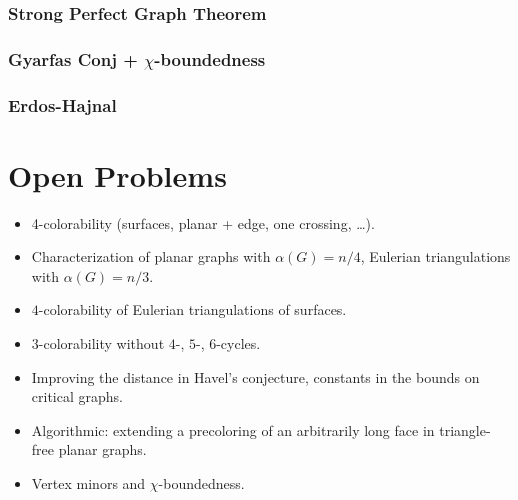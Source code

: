 \documentclass[12pt,twoside,openright,a4paper]{book}
\begin{document}
\section{Strong Perfect Graph Theorem}
\section{Gyarfas Conj + $\chi$-boundedness}
\section{Erdos-Hajnal}

\part{Open Problems}

\begin{itemize}
\item 4-colorability (surfaces, planar + edge, one crossing, \ldots).
\item Characterization of planar graphs with $\alpha(G)=n/4$, Eulerian triangulations with $\alpha(G)=n/3$.
\item $4$-colorability of Eulerian triangulations of surfaces.
\item $3$-colorability without $4$-, $5$-, $6$-cycles.
\item Improving the distance in Havel's conjecture, constants in the bounds on critical graphs.
\item Algorithmic: extending a precoloring of an arbitrarily long face in triangle-free planar graphs.
\item Vertex minors and $\chi$-boundedness.
\end{itemize}

\newpage
\pagestyle{plain}
\printindex



\end{document}
